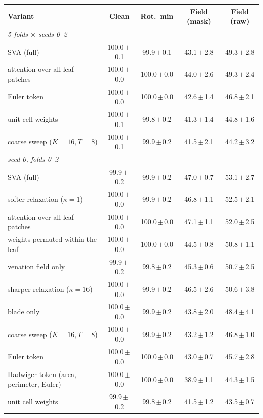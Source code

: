\begin{tabular}{lcccc}
\toprule
Variant & Clean & Rot.\ min & Field (mask) & Field (raw) \\
\midrule
\multicolumn{5}{l}{\emph{5 folds $\times$ seeds 0--2}} \\
SVA (full) & 100.0\,$\pm$\,0.1 & 99.9\,$\pm$\,0.1 & 43.1\,$\pm$\,2.8 & 49.3\,$\pm$\,2.8 \\
attention over all leaf patches & 100.0\,$\pm$\,0.0 & 100.0\,$\pm$\,0.0 & 44.0\,$\pm$\,2.6 & 49.3\,$\pm$\,2.4 \\
Euler token & 100.0\,$\pm$\,0.0 & 100.0\,$\pm$\,0.0 & 42.6\,$\pm$\,1.4 & 46.8\,$\pm$\,2.1 \\
unit cell weights & 100.0\,$\pm$\,0.1 & 99.8\,$\pm$\,0.2 & 41.3\,$\pm$\,1.4 & 44.8\,$\pm$\,1.6 \\
coarse sweep ($K{=}16,T{=}8$) & 100.0\,$\pm$\,0.1 & 99.9\,$\pm$\,0.2 & 41.5\,$\pm$\,2.1 & 44.2\,$\pm$\,3.2 \\
\midrule
\multicolumn{5}{l}{\emph{seed 0, folds 0--2}} \\
SVA (full) & 99.9\,$\pm$\,0.2 & 99.9\,$\pm$\,0.2 & 47.0\,$\pm$\,0.7 & 53.1\,$\pm$\,2.7 \\
softer relaxation ($\kappa{=}1$) & 100.0\,$\pm$\,0.0 & 99.9\,$\pm$\,0.2 & 46.8\,$\pm$\,1.1 & 52.5\,$\pm$\,2.1 \\
attention over all leaf patches & 100.0\,$\pm$\,0.0 & 100.0\,$\pm$\,0.0 & 47.1\,$\pm$\,1.1 & 52.0\,$\pm$\,2.5 \\
weights permuted within the leaf & 100.0\,$\pm$\,0.0 & 100.0\,$\pm$\,0.0 & 44.5\,$\pm$\,0.8 & 50.8\,$\pm$\,1.1 \\
venation field only & 99.9\,$\pm$\,0.2 & 99.8\,$\pm$\,0.2 & 45.3\,$\pm$\,0.6 & 50.7\,$\pm$\,2.5 \\
sharper relaxation ($\kappa{=}16$) & 100.0\,$\pm$\,0.0 & 99.9\,$\pm$\,0.2 & 46.5\,$\pm$\,2.6 & 50.6\,$\pm$\,3.8 \\
blade only & 100.0\,$\pm$\,0.0 & 99.9\,$\pm$\,0.2 & 43.8\,$\pm$\,2.0 & 48.4\,$\pm$\,4.1 \\
coarse sweep ($K{=}16,T{=}8$) & 100.0\,$\pm$\,0.0 & 99.9\,$\pm$\,0.2 & 43.2\,$\pm$\,1.2 & 46.8\,$\pm$\,1.0 \\
Euler token & 100.0\,$\pm$\,0.0 & 100.0\,$\pm$\,0.0 & 43.0\,$\pm$\,0.7 & 45.7\,$\pm$\,2.8 \\
Hadwiger token (area, perimeter, Euler) & 100.0\,$\pm$\,0.0 & 100.0\,$\pm$\,0.0 & 38.9\,$\pm$\,1.1 & 44.3\,$\pm$\,1.5 \\
unit cell weights & 99.9\,$\pm$\,0.2 & 99.8\,$\pm$\,0.2 & 41.5\,$\pm$\,1.2 & 43.5\,$\pm$\,0.7 \\
\bottomrule
\end{tabular}